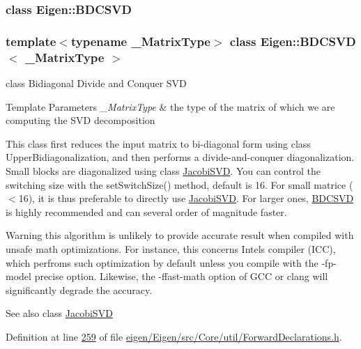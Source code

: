 \subsubsection{class Eigen\+:\+:B\+D\+C\+S\+VD}
\subsubsection*{template$<$typename \+\_\+\+Matrix\+Type$>$\newline
class Eigen\+::\+B\+D\+C\+S\+V\+D$<$ \+\_\+\+Matrix\+Type $>$}

class Bidiagonal Divide and Conquer S\+VD 


\begin{DoxyTemplParams}{Template Parameters}
{\em \+\_\+\+Matrix\+Type} & the type of the matrix of which we are computing the S\+VD decomposition\\
\hline
\end{DoxyTemplParams}
This class first reduces the input matrix to bi-\/diagonal form using class Upper\+Bidiagonalization, and then performs a divide-\/and-\/conquer diagonalization. Small blocks are diagonalized using class \hyperlink{group___s_v_d___module_class_eigen_1_1_jacobi_s_v_d}{Jacobi\+S\+VD}. You can control the switching size with the set\+Switch\+Size() method, default is 16. For small matrice ($<$16), it is thus preferable to directly use \hyperlink{group___s_v_d___module_class_eigen_1_1_jacobi_s_v_d}{Jacobi\+S\+VD}. For larger ones, \hyperlink{group___s_v_d___module_class_eigen_1_1_b_d_c_s_v_d}{B\+D\+C\+S\+VD} is highly recommended and can several order of magnitude faster.

\begin{DoxyWarning}{Warning}
this algorithm is unlikely to provide accurate result when compiled with unsafe math optimizations. For instance, this concerns Intel\textquotesingle{}s compiler (I\+CC), which perfroms such optimization by default unless you compile with the {\ttfamily -\/fp-\/model} {\ttfamily precise} option. Likewise, the {\ttfamily -\/ffast-\/math} option of G\+CC or clang will significantly degrade the accuracy.
\end{DoxyWarning}
\begin{DoxySeeAlso}{See also}
class \hyperlink{group___s_v_d___module_class_eigen_1_1_jacobi_s_v_d}{Jacobi\+S\+VD} 
\end{DoxySeeAlso}


Definition at line \hyperlink{eigen_2_eigen_2src_2_core_2util_2_forward_declarations_8h_source_l00259}{259} of file \hyperlink{eigen_2_eigen_2src_2_core_2util_2_forward_declarations_8h_source}{eigen/\+Eigen/src/\+Core/util/\+Forward\+Declarations.\+h}.

